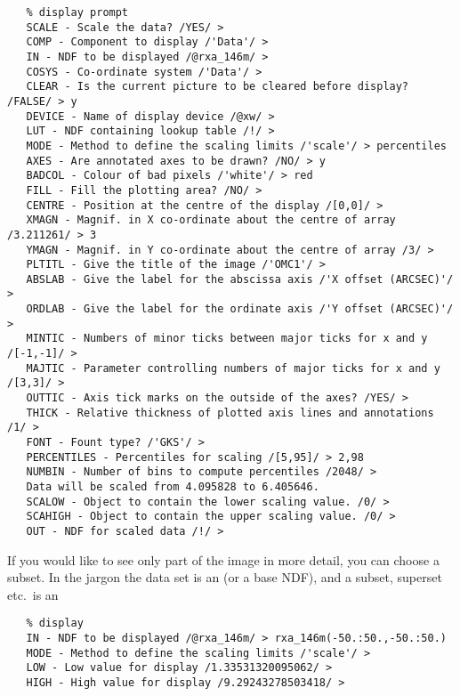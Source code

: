 \begin{verbatim}
   % display prompt
   SCALE - Scale the data? /YES/ >
   COMP - Component to display /'Data'/ >
   IN - NDF to be displayed /@rxa_146m/ >
   COSYS - Co-ordinate system /'Data'/ >
   CLEAR - Is the current picture to be cleared before display? /FALSE/ > y
   DEVICE - Name of display device /@xw/ >
   LUT - NDF containing lookup table /!/ >
   MODE - Method to define the scaling limits /'scale'/ > percentiles
   AXES - Are annotated axes to be drawn? /NO/ > y
   BADCOL - Colour of bad pixels /'white'/ > red
   FILL - Fill the plotting area? /NO/ >
   CENTRE - Position at the centre of the display /[0,0]/ >
   XMAGN - Magnif. in X co-ordinate about the centre of array /3.211261/ > 3
   YMAGN - Magnif. in Y co-ordinate about the centre of array /3/ >
   PLTITL - Give the title of the image /'OMC1'/ >
   ABSLAB - Give the label for the abscissa axis /'X offset (ARCSEC)'/ >
   ORDLAB - Give the label for the ordinate axis /'Y offset (ARCSEC)'/ >
   MINTIC - Numbers of minor ticks between major ticks for x and y /[-1,-1]/ >
   MAJTIC - Parameter controlling numbers of major ticks for x and y /[3,3]/ >
   OUTTIC - Axis tick marks on the outside of the axes? /YES/ >
   THICK - Relative thickness of plotted axis lines and annotations /1/ >
   FONT - Fount type? /'GKS'/ >
   PERCENTILES - Percentiles for scaling /[5,95]/ > 2,98
   NUMBIN - Number of bins to compute percentiles /2048/ >
   Data will be scaled from 4.095828 to 6.405646.
   SCALOW - Object to contain the lower scaling value. /0/ >
   SCAHIGH - Object to contain the upper scaling value. /0/ >
   OUT - NDF for scaled data /!/ >
\end{verbatim}

\begin{latexonly}
\begin{center}
\leavevmode\epsfysize=80mm
\end{center}
\end{latexonly}

   If you would like to see only part of the image in more detail,
   you can choose a subset. In the jargon the data set is an
   (or a base NDF), and a subset, superset etc.\ is an

\begin{verbatim}
   % display
   IN - NDF to be displayed /@rxa_146m/ > rxa_146m(-50.:50.,-50.:50.)
   MODE - Method to define the scaling limits /'scale'/ >
   LOW - Low value for display /1.33531320095062/ >
   HIGH - High value for display /9.29243278503418/ >
\end{verbatim}

